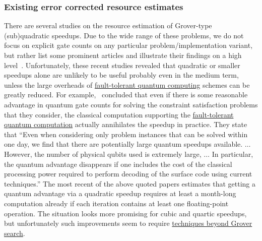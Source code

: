 \begin{refsection}
	
	\subsubsection*{Existing error corrected resource estimates}
	
	There are several studies on the resource estimation of Grover-type (sub)quadratic speedups. Due to the wide range of these problems, we do not focus on explicit gate counts on any particular problem/implementation variant, but rather list some prominent articles and illustrate their findings on a high level~\cite{campbell2019ApplyingQToCSPs,sanders2020FTQCforCombOpt,babbush2021FocusBeyondQuadratic,cade2022quantifying,cade2022quantum,hoefler2023RealAchievQAdvantage}.
	Unfortunately, these recent studies revealed that quadratic or smaller speedups alone are unlikely to be useful probably even in the medium term, unless the large overheads of  \hyperref[prim:FTQC]{fault-tolerant quantum computing} schemes can be greatly reduced.
    For example,~\cite{sanders2020FTQCforCombOpt} concluded that even if there is some reasonable advantage in quantum gate counts for solving the constraint satisfaction problems that they consider, the classical computation supporting the  \hyperref[prim:FTQC]{fault-tolerant quantum computation} actually annihilates the speedup in practice. They state that ``Even when considering only problem instances that can be solved within one day, we find that there are potentially large quantum speedups available. $\ldots$ However, the number of physical qubits used is extremely large, $\ldots$ In particular, the quantum advantage disappears if one includes the cost of the classical processing power required to perform decoding of the surface code using current techniques.'' 
	The most recent of the above quoted papers \cite{hoefler2023RealAchievQAdvantage} estimates that getting a quantum advantage via a quadratic speedup requires at least a month-long computation already if each iteration contains at least one floating-point operation.
	The situation looks more promising for cubic and quartic speedups, but unfortunately such improvements seem to require \hyperref[appl:BeyondGrover]{techniques beyond Grover search}.
	
	
	

\end{refsection}
